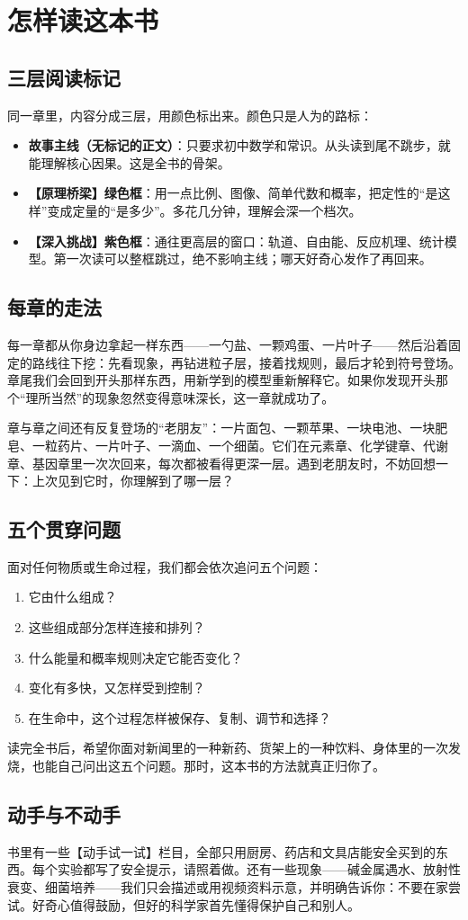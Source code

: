 \chapter*{怎样读这本书}

\section*{三层阅读标记}

同一章里，内容分成三层，用颜色标出来。颜色只是人为的路标：

\begin{itemize}[itemsep=4pt]
\item \textbf{故事主线（无标记的正文）}：只要求初中数学和常识。从头读到尾不跳步，就能理解核心因果。这是全书的骨架。
\item \textbf{【原理桥梁】绿色框}：用一点比例、图像、简单代数和概率，把定性的“是这样”变成定量的“是多少”。多花几分钟，理解会深一个档次。
\item \textbf{【深入挑战】紫色框}：通往更高层的窗口：轨道、自由能、反应机理、统计模型。第一次读可以整框跳过，绝不影响主线；哪天好奇心发作了再回来。
\end{itemize}

\section*{每章的走法}

每一章都从你身边拿起一样东西——一勺盐、一颗鸡蛋、一片叶子——然后沿着固定的路线往下挖：先看现象，再钻进粒子层，接着找规则，最后才轮到符号登场。章尾我们会回到开头那样东西，用新学到的模型重新解释它。如果你发现开头那个“理所当然”的现象忽然变得意味深长，这一章就成功了。

章与章之间还有反复登场的“老朋友”：一片面包、一颗苹果、一块电池、一块肥皂、一粒药片、一片叶子、一滴血、一个细菌。它们在元素章、化学键章、代谢章、基因章里一次次回来，每次都被看得更深一层。遇到老朋友时，不妨回想一下：上次见到它时，你理解到了哪一层？

\section*{五个贯穿问题}

面对任何物质或生命过程，我们都会依次追问五个问题：

\begin{enumerate}[itemsep=2pt]
\item 它由什么组成？
\item 这些组成部分怎样连接和排列？
\item 什么能量和概率规则决定它能否变化？
\item 变化有多快，又怎样受到控制？
\item 在生命中，这个过程怎样被保存、复制、调节和选择？
\end{enumerate}

读完全书后，希望你面对新闻里的一种新药、货架上的一种饮料、身体里的一次发烧，也能自己问出这五个问题。那时，这本书的方法就真正归你了。

\section*{动手与不动手}

书里有一些【动手试一试】栏目，全部只用厨房、药店和文具店能安全买到的东西。每个实验都写了安全提示，请照着做。还有一些现象——碱金属遇水、放射性衰变、细菌培养——我们只会描述或用视频资料示意，并明确告诉你：不要在家尝试。好奇心值得鼓励，但好的科学家首先懂得保护自己和别人。
